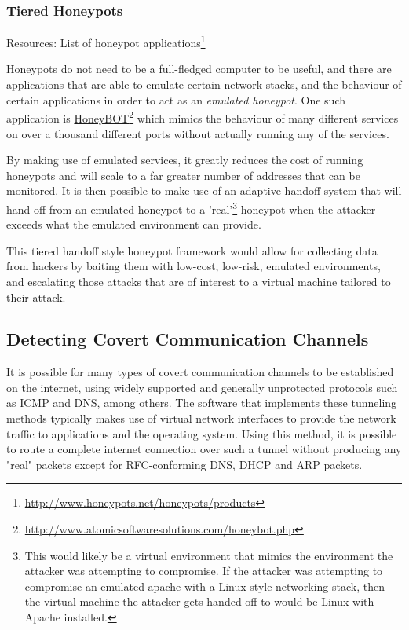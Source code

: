 \documentclass{article}
\newcommand{\hreff}[2]{\href{#1}{#2}\footnote{\url{#1}}}
\theoremstyle{remark}
\theoremstyle{definition}
\theoremstyle{definition}
\theoremstyle{definition}
\begin{document}
\subsubsection{Tiered Honeypots}
Resources: List of honeypot applications\footnote{\url{http://www.honeypots.net/honeypots/products}}

Honeypots do not need to be a full-fledged computer to be useful, and there are applications that are able to emulate certain network stacks, and the behaviour of certain applications in order to act as an \emph{emulated honeypot}. One such application is \hreff{http://www.atomicsoftwaresolutions.com/honeybot.php}{HoneyBOT} which mimics the behaviour of many different services on over a thousand different ports without actually running any of the services.

By making use of emulated services, it greatly reduces the cost of running honeypots and will scale to a far greater number of addresses that can be monitored. It is then possible to make use of an adaptive handoff system that will hand off from an emulated honeypot to a 'real'\footnote{This would likely be a virtual environment that mimics the environment the attacker was attempting to compromise. If the attacker was attempting to compromise an emulated apache with a Linux-style networking stack, then the virtual machine the attacker gets handed off to would be Linux with Apache installed.} honeypot when the attacker exceeds what the emulated environment can provide.

This tiered handoff style honeypot framework would allow for collecting data from hackers by baiting them with low-cost, low-risk, emulated environments, and escalating those attacks that are of interest to a virtual machine tailored to their attack.

\subsection{Detecting Covert Communication Channels}
\label{covert-channels}
It is possible for many types of covert communication channels to be established on the internet, using widely supported and generally unprotected protocols such as ICMP and DNS, among others. The software that implements these tunneling methods typically makes use of virtual network interfaces to provide the network traffic to applications and the operating system. Using this method, it is possible to route a complete internet connection over such a tunnel without producing any "real" packets except for RFC-conforming DNS, DHCP and ARP packets.
\end{document}
